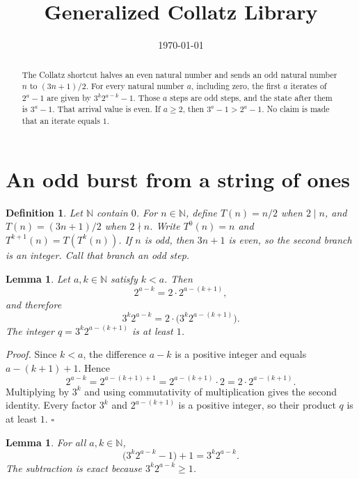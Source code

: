 \documentclass[11pt,letterpaper]{article}
\title{Generalized Collatz Library}
\author{}
\date{\today}
\newcommand{\N}{\mathbb{N}}
\newtheorem{lemma}[theorem]{Lemma}
\newtheorem{definition}[theorem]{Definition}
\newenvironment{proof}{\noindent\textit{Proof.}}{\hfill\(\square\)}
\begin{document}
\maketitle
\section*{An odd burst from a string of ones}

\begin{abstract}
The Collatz shortcut halves an even natural number and sends an odd natural number \(n\) to \((3n+1)/2\). For every natural number \(a\), including zero, the first \(a\) iterates of \(2^{a}-1\) are given by \(3^{k}2^{a-k}-1\). Those \(a\) steps are odd steps, and the state after them is \(3^{a}-1\). That arrival value is even. If \(a\ge 2\), then \(3^{a}-1>2^{a}-1\). No claim is made that an iterate equals \(1\).
\end{abstract}

\begin{definition}
\label{def:shortcut}
Let \(\N\) contain \(0\). For \(n\in\N\), define \(T(n)=n/2\) when \(2\mid n\), and \(T(n)=(3n+1)/2\) when \(2\nmid n\). Write \(T^{0}(n)=n\) and \(T^{k+1}(n)=T(T^{k}(n))\). If \(n\) is odd, then \(3n+1\) is even, so the second branch is an integer. Call that branch an odd step.
\end{definition}

\begin{lemma}
\label{lem:split}
Let \(a,k\in\N\) satisfy \(k<a\). Then
\[
2^{a-k}=2\cdot 2^{a-(k+1)},
\]
and therefore
\[
3^{k}2^{a-k}=2\cdot\bigl(3^{k}2^{a-(k+1)}\bigr).
\]
The integer \(q=3^{k}2^{a-(k+1)}\) is at least \(1\).
\end{lemma}

\begin{proof}
Since \(k<a\), the difference \(a-k\) is a positive integer and equals \(a-(k+1)+1\). Hence
\[
2^{a-k}=2^{a-(k+1)+1}=2^{a-(k+1)}\cdot 2=2\cdot 2^{a-(k+1)}.
\]
Multiplying by \(3^{k}\) and using commutativity of multiplication gives the second identity. Every factor \(3^{k}\) and \(2^{a-(k+1)}\) is a positive integer, so their product \(q\) is at least \(1\).
\end{proof}

\begin{lemma}
\label{lem:restore}
For all \(a,k\in\N\),
\[
\bigl(3^{k}2^{a-k}-1\bigr)+1=3^{k}2^{a-k}.
\]
The subtraction is exact because \(3^{k}2^{a-k}\ge 1\).
\end{lemma}
\end{document}
